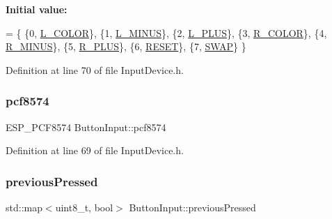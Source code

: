 {\bfseries Initial value\+:}
\begin{DoxyCode}
= \{
        \{0, \hyperlink{class_input_device_a75152d8f06b6d032036014e42e44688ba62e8e3a8805c10a1aeafdf32508a363d}{L\_COLOR}\},
        \{1, \hyperlink{class_input_device_a75152d8f06b6d032036014e42e44688ba0a6c0f0f21ce6b32c7f9bf45c268ed7d}{L\_MINUS}\},
        \{2, \hyperlink{class_input_device_a75152d8f06b6d032036014e42e44688ba2dfac8e357208426c5557646fc4851bc}{L\_PLUS}\},
        \{3, \hyperlink{class_input_device_a75152d8f06b6d032036014e42e44688ba55ff3df43eb079f61c3de4c26e891484}{R\_COLOR}\},
        \{4, \hyperlink{class_input_device_a75152d8f06b6d032036014e42e44688bafaf17bc1c44227054bb36ff122009380}{R\_MINUS}\},
        \{5, \hyperlink{class_input_device_a75152d8f06b6d032036014e42e44688ba01c5d472c59979ad6c0ed0515e4f0b76}{R\_PLUS}\},
        \{6, \hyperlink{class_input_device_a75152d8f06b6d032036014e42e44688ba906dded9cca7bddf13e5b394c4aa66ed}{RESET}\},
        \{7, \hyperlink{class_input_device_a75152d8f06b6d032036014e42e44688ba4ff7ca0942a282a8006d53cd81ee4ba4}{SWAP}\}
        \}
\end{DoxyCode}


Definition at line 70 of file Input\+Device.\+h.

\mbox{\label{class_button_input_adcda808bd27b4cb481e2630b07fe98d9}} 
\subsubsection{\texorpdfstring{pcf8574}{pcf8574}}
{\footnotesize\ttfamily E\+S\+P\+\_\+\+P\+C\+F8574 Button\+Input\+::pcf8574\hspace{0.3cm}{\ttfamily [private]}}



Definition at line 69 of file Input\+Device.\+h.

\mbox{\label{class_button_input_af8ee1752f6b9bba394f868a5401697f4}} 
\subsubsection{\texorpdfstring{previous\+Pressed}{previousPressed}}
{\footnotesize\ttfamily std\+::map$<$uint8\+\_\+t, bool$>$ Button\+Input\+::previous\+Pressed\hspace{0.3cm}{\ttfamily [private]}}



